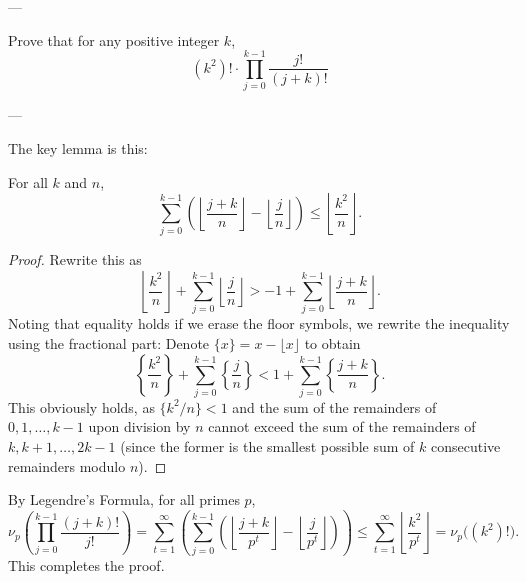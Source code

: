 
---

Prove that for any positive integer $k$, \[(k^2)!\cdot\prod_{j=0}^{k-1}\frac{j!}{(j+k)!}\]

---

The key lemma is this:
\begin{boxlemma*}
    For all $k$ and $n$, \[\sum_{j=0}^{k-1}\left(\left\lfloor\frac{j+k}n\right\rfloor-\left\lfloor\frac jn\right\rfloor\right)\le\left\lfloor\frac{k^2}n\right\rfloor.\]
\end{boxlemma*}
\begin{proof}
    Rewrite this as \[\left\lfloor\frac{k^2}n\right\rfloor+\sum_{j=0}^{k-1}\left\lfloor\frac jn\right\rfloor>-1+\sum_{j=0}^{k-1}\left\lfloor\frac{j+k}n\right\rfloor.\]
    Noting that equality holds if we erase the floor symbols, we rewrite the inequality using the fractional part: Denote $\{x\}=x-\lfloor x\rfloor$ to obtain \[\left\{\frac{k^2}n\right\}+\sum_{j=0}^{k-1}\left\{\frac jn\right\}<1+\sum_{j=0}^{k-1}\left\{\frac{j+k}n\right\}.\]
This obviously holds, as $\{k^2/n\}<1$ and the sum of the remainders of $0,1,\ldots,k-1$ upon division by $n$ cannot exceed the sum of the remainders of $k,k+1,\ldots,2k-1$ (since the former is the smallest possible sum of $k$ consecutive remainders modulo $n$).
\end{proof}

By Legendre's Formula, for all primes $p$, \[\nu_p\left(\prod_{j=0}^{k-1}\frac{(j+k)!}{j!}\right)=\sum_{t=1}^\infty\left(\sum_{j=0}^{k-1}\left(\left\lfloor\frac{j+k}{p^t}\right\rfloor-\left\lfloor\frac j{p^t}\right\rfloor\right)\right)\le\sum_{t=1}^\infty\left\lfloor\frac{k^2}{p^t}\right\rfloor=\nu_p\Big((k^2)!\Big).\]
This completes the proof.
